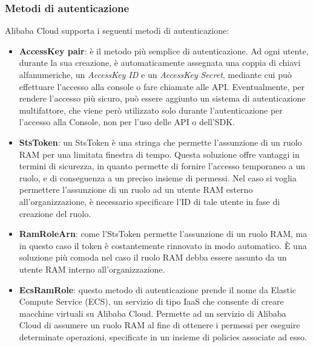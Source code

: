 \documentclass[a4paper]{article}
\begin{document}
\subsubsection{Metodi di autenticazione}
Alibaba Cloud supporta i seguenti metodi di autenticazione:
\begin{itemize}
    \item{\textbf{AccessKey pair}}: è il metodo più semplice di autenticazione. Ad ogni utente, durante la sua creazione, è automaticamente assegnata una coppia di chiavi alfanumeriche, un \textit{AccessKey ID} e un \textit{AccessKey Secret}, mediante cui può effettuare l'accesso alla console o fare chiamate alle API. Eventualmente, per rendere l'accesso più sicuro, può essere aggiunto un sistema di autenticazione multifattore, che viene però utilizzato solo durante l'autenticazione per l'accesso alla Console, non per l'uso delle API o dell'SDK.\cite{alibaba_ak}
    
    \item{\textbf{StsToken}}: un StsToken è una stringa che permette l'assunzione di un ruolo RAM per una limitata finestra di tempo. Questa soluzione offre vantaggi in termini di sicurezza, in quanto permette di fornire l'accesso temporaneo a un ruolo, e di conseguenza a un preciso insieme di permessi. Nel caso si voglia permettere l'assunzione di un ruolo ad un utente RAM esterno all'organizzazione, è necessario specificare l'ID di tale utente in fase di creazione del ruolo.\cite{alibaba_access}
    
    \item{\textbf{RamRoleArn}}: come l'StsToken permette l'assunzione di un ruolo RAM, ma in questo caso il token è costantemente rinnovato in modo automatico. È una soluzione più comoda nel caso il ruolo RAM debba essere assunto da un utente RAM interno all'organizzazione.\cite{alibaba_access}
    
    \item{\textbf{EcsRamRole}}: questo metodo di autenticazione prende il nome da Elastic Compute Service (ECS), un servizio di tipo IaaS che consente di creare macchine virtuali su Alibaba Cloud. Permette ad un servizio di Alibaba Cloud di assumere un ruolo RAM al fine di ottenere i permessi per eseguire determinate operazioni, specificate in un insieme di policies associate ad esso.\cite{alibaba_ecsrole}
    

\end{itemize}
\end{document}
